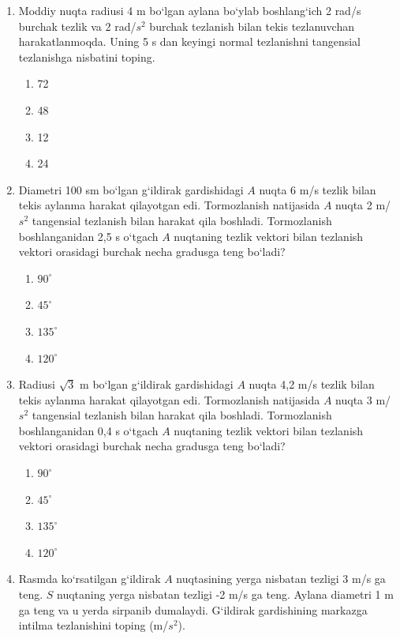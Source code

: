 \begin{enumerate}
\item Moddiy nuqta radiusi 4 m bo‘lgan aylana bo‘ylab boshlang‘ich 2 rad/s burchak tezlik va 2 rad/$s^2$ burchak tezlanish bilan tekis tezlanuvchan harakatlanmoqda. Uning 5 s dan keyingi normal tezlanishni tangensial tezlanishga nisbatini toping.
\begin{enumerate}[label=\Alph*)]
\item 72
\item 48
\item 12
\item 24

\end{enumerate}

\item Diametri 100 sm bo‘lgan g‘ildirak gardishidagi $A$ nuqta 6 m/s tezlik bilan tekis aylanma harakat qilayotgan edi. Tormozlanish natijasida $A$ nuqta 2 m/$s^2$ tangensial tezlanish bilan harakat qila boshladi. Tormozlanish boshlanganidan 2,5 s o‘tgach $A$ nuqtaning tezlik vektori bilan tezlanish vektori orasidagi burchak necha gradusga teng bo‘ladi?
\begin{enumerate}[label=\Alph*)]
\item $90^\circ$
\item $45^\circ$
\item $135^\circ$
\item $120^\circ$
\end{enumerate}

\item Radiusi $\sqrt{3}$ m bo‘lgan g‘ildirak gardishidagi $A$ nuqta 4,2 m/s tezlik bilan tekis aylanma harakat qilayotgan edi. Tormozlanish natijasida $A$ nuqta 3 m/$s^2$ tangensial tezlanish bilan harakat qila boshladi. Tormozlanish boshlanganidan 0,4 s o‘tgach $A$ nuqtaning tezlik vektori bilan tezlanish vektori orasidagi burchak necha gradusga teng bo‘ladi?
\begin{enumerate}[label=\Alph*)]
\item $90^\circ$
\item $45^\circ$
\item $135^\circ$
\item $120^\circ$
\end{enumerate}

\item Rasmda ko‘rsatilgan g‘ildirak $A$ nuqtasining yerga nisbatan tezligi 3 m/s ga teng. $S$ nuqtaning yerga nisbatan tezligi -2 m/s ga teng. Aylana diametri 1 m ga teng va u yerda sirpanib dumalaydi. G‘ildirak gardishining markazga intilma tezlanishini toping (m/$s^2$).


\end{enumerate}
